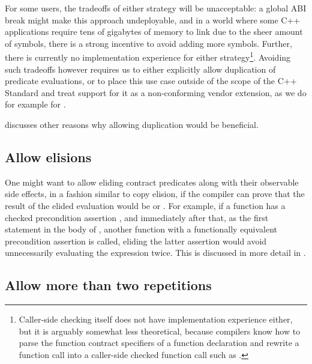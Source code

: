 For some users, the tradeoffs of either strategy will be unacceptable: a global ABI break might make this approach undeployable, and in a world where some C++ applications require tens of gigabytes of memory to link due to the sheer amount of symbols, there is a strong incentive to avoid adding more symbols. Further, there is currently no implementation experience for either strategy\footnote{Caller-side checking itself does not have implementation experience either, but it is arguably somewhat less theoretical, because compilers know how to parse the function contract specifiers of a function declaration and rewrite a function call  into a caller-side checked function call such as \mbox{}.}. Avoiding such tradeoffs however requires us to either explicitly allow duplication of predicate evaluations, or to place this use case outside of the scope of the C++ Standard and treat support for it as a non-conforming vendor extension, as we do for example for .

\cite{P2751R1} discusses other reasons why allowing duplication would be beneficial.

\subsection{Allow elisions}
\label{subsec:elisions}

One might want to allow eliding contract predicates along with their observable side effects, in a fashion similar to copy elision, if the compiler can prove that the result of the elided evaluation would be  or . For example, if a function  has a checked precondition assertion , and immediately after that, as the first statement in the body of , another function  with a functionally equivalent precondition assertion is called, eliding the latter assertion would avoid unnecessarily evaluating the expression  twice. This is discussed in more detail in \cite{P2751R1}.

\subsection{Allow more than two repetitions}
\label{subsec:rep}

